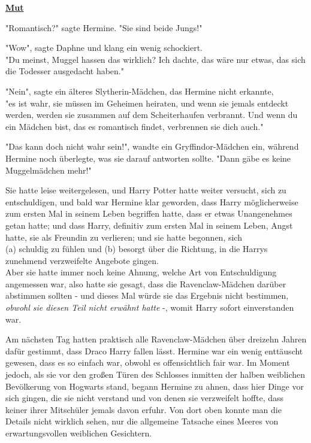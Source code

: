 

\hypertarget{mut}{%

\textbf{\uline{Mut}}

"Romantisch?" sagte Hermine. "Sie sind beide Jungs!"

"Wow", sagte Daphne und klang ein wenig schockiert.\\ "Du meinst, Muggel hassen das wirklich? Ich dachte, das wäre nur etwas, das sich die Todesser ausgedacht haben."

"Nein", sagte ein älteres Slytherin-Mädchen, das Hermine nicht erkannte,\\ "es ist wahr, sie müssen im Geheimen heiraten, und wenn sie jemals entdeckt werden, werden sie zusammen auf dem Scheiterhaufen verbrannt. Und wenn du ein Mädchen bist, das es romantisch findet, verbrennen sie dich auch."

"Das kann doch nicht wahr sein!", wandte ein Gryffindor-Mädchen ein, während Hermine noch überlegte, was sie darauf antworten sollte. "Dann gäbe es keine Muggelmädchen mehr!"

Sie hatte leise weitergelesen, und Harry Potter hatte weiter versucht, sich zu entschuldigen, und bald war Hermine klar geworden, dass Harry möglicherweise zum ersten Mal in seinem Leben begriffen hatte, dass er etwas Unangenehmes getan hatte; und dass Harry, definitiv zum ersten Mal in seinem Leben, Angst hatte, sie als Freundin zu verlieren; und sie hatte begonnen, sich\\ (a) schuldig zu fühlen und (b) besorgt über die Richtung, in die Harrys zunehmend verzweifelte Angebote gingen.\\ Aber sie hatte immer noch keine Ahnung, welche Art von Entschuldigung angemessen war, also hatte sie gesagt, dass die Ravenclaw-Mädchen darüber abstimmen sollten - und dieses Mal würde sie das Ergebnis nicht bestimmen, \emph{obwohl sie diesen Teil nicht erwähnt hatte} -, womit Harry sofort einverstanden war.

Am nächsten Tag hatten praktisch alle Ravenclaw-Mädchen über dreizehn Jahren dafür gestimmt, dass Draco Harry fallen lässt. Hermine war ein wenig enttäuscht gewesen, dass es so einfach war, obwohl es offensichtlich fair war. Im Moment jedoch, als sie vor den großen Türen des Schlosses inmitten der halben weiblichen Bevölkerung von Hogwarts stand, begann Hermine zu ahnen, dass hier Dinge vor sich gingen, die sie nicht verstand und von denen sie verzweifelt hoffte, dass keiner ihrer Mitschüler jemals davon erfuhr. Von dort oben konnte man die Details nicht wirklich sehen, nur die allgemeine Tatsache eines Meeres von erwartungsvollen weiblichen Gesichtern.

}
